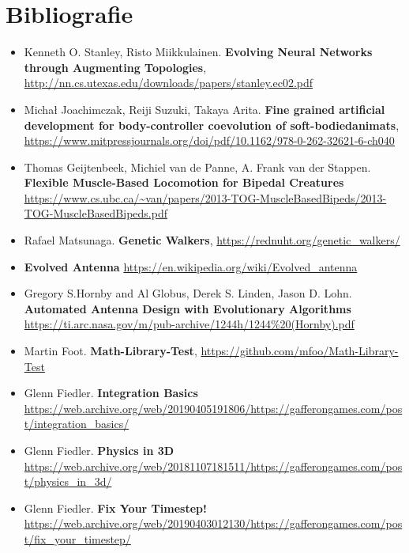 \chapter*{Bibliografie} 

\begin{itemize}
    \item Kenneth O. Stanley, Risto Miikkulainen. \textbf{Evolving Neural Networks through Augmenting Topologies}, \url{http://nn.cs.utexas.edu/downloads/papers/stanley.ec02.pdf}
    \item Michał Joachimczak, Reiji Suzuki,  Takaya Arita. \textbf{Fine grained artificial development for body-controller coevolution of soft-bodiedanimats}, \url{https://www.mitpressjournals.org/doi/pdf/10.1162/978-0-262-32621-6-ch040}
    \item Thomas Geijtenbeek, Michiel van de Panne, A. Frank van der Stappen. \textbf{Flexible Muscle-Based Locomotion for Bipedal Creatures} \url {https://www.cs.ubc.ca/~van/papers/2013-TOG-MuscleBasedBipeds/2013-TOG-MuscleBasedBipeds.pdf}
    \item Rafael Matsunaga. \textbf{Genetic Walkers}, \url{https://rednuht.org/genetic_walkers/}
    \item \textbf{Evolved Antenna} \url{https://en.wikipedia.org/wiki/Evolved_antenna}
    \item Gregory S.Hornby and Al Globus, Derek S. Linden, Jason D. Lohn. \textbf{Automated Antenna Design with Evolutionary Algorithms} \url{https://ti.arc.nasa.gov/m/pub-archive/1244h/1244%20(Hornby).pdf}
    \item Martin Foot. \textbf{Math-Library-Test}, \url{https://github.com/mfoo/Math-Library-Test}
    \item Glenn Fiedler. \textbf{Integration Basics} \url{https://web.archive.org/web/20190405191806/https://gafferongames.com/post/integration_basics/}
    \item Glenn Fiedler. \textbf{Physics in 3D} \url{https://web.archive.org/web/20181107181511/https://gafferongames.com/post/physics_in_3d/}
    \item Glenn Fiedler. \textbf{Fix Your Timestep!} \url{https://web.archive.org/web/20190403012130/https://gafferongames.com/post/fix_your_timestep/}
\end{itemize} 